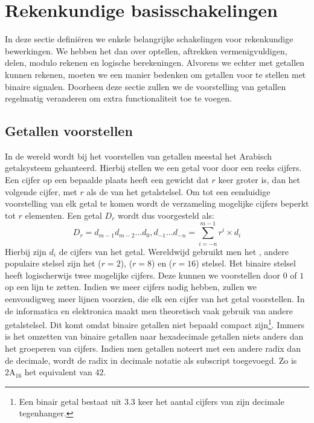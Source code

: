 \section{Rekenkundige basisschakelingen}
\label{s:rekenkundig}
In deze sectie defini\"eren we enkele belangrijke schakelingen voor rekenkundige bewerkingen. We hebben het dan over optellen, aftrekken vermenigvuldigen, delen, modulo rekenen en logische berekeningen. Alvorens we echter met getallen kunnen rekenen, moeten we een manier bedenken om getallen voor te stellen met binaire signalen. Doorheen deze sectie zullen we de voorstelling van getallen regelmatig veranderen om extra functionaliteit toe te voegen.
\subsection{Getallen voorstellen}
In de wereld wordt bij het voorstellen van getallen meestal het Arabisch getalsysteem gehanteerd. Hierbij stellen we een getal voor door een reeks cijfers. Een cijfer op een bepaalde plaats heeft een gewicht dat $r$ keer groter is, dan het volgende cijfer, met $r$ als de  van het getalstelsel. Om tot een eenduidige voorstelling van elk getal te komen wordt de verzameling mogelijke cijfers beperkt tot $r$ elementen. Een getal $D_r$ wordt dus voorgesteld als:
\begin{equation}
D_r=d_{m-1}d_{m-2}\ldots d_0,d_{-1}\ldots d_{-n}=\displaystyle\sum_{i=-n}^{m-1}{r^i\times d_i}
\label{eqn:numberRepresentation}
\end{equation}
Hierbij zijn $d_i$ de cijfers van het getal. Wereldwijd gebruikt men het , andere populaire stelsel zijn het  ($r=2$),  ($r=8$) en  ($r=16$) stelsel. Het binaire stelsel heeft logischerwijs twee mogelijke cijfers. Deze kunnen we voorstellen door $0$ of $1$ op een lijn te zetten. Indien we meer cijfers nodig hebben, zullen we eenvoudigweg meer lijnen voorzien, die elk een cijfer van het getal voorstellen. In de informatica en elektronica maakt men theoretisch vaak gebruik van andere getalstelsel. Dit komt omdat binaire getallen niet bepaald compact zijn\footnote{Een binair getal bestaat uit $3.3$ keer het aantal cijfers van zijn decimale tegenhanger.}. Immers is het omzetten van binaire getallen naar hexadecimale getallen niets anders dan het groeperen van cijfers. Indien men getallen noteert met een andere radix dan de decimale, wordt de radix in decimale notatie als subscript toegevoegd. Zo is $\mbox{2A}_{16}$ het equivalent van $42$.
